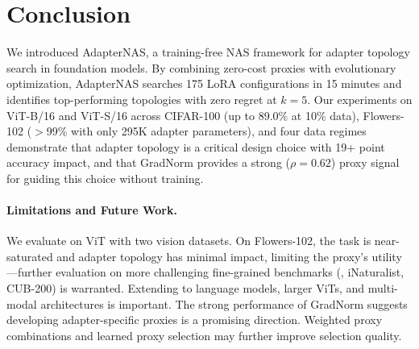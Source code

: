 \documentclass[10pt,twocolumn,letterpaper]{article}
\newcommand{\method}{AdapterNAS\xspace}
\begin{document}
\section{Conclusion}
\label{sec:conclusion}

We introduced \method, a training-free NAS framework for adapter topology search in foundation models. By combining zero-cost proxies with evolutionary optimization, \method searches 175 LoRA configurations in 15 minutes and identifies top-performing topologies with zero regret at $k{=}5$. Our experiments on ViT-B/16 and ViT-S/16 across CIFAR-100 (up to 89.0\% at 10\% data), Flowers-102 ($>$99\% with only 295K adapter parameters), and four data regimes demonstrate that adapter topology is a critical design choice with 19+ point accuracy impact, and that GradNorm provides a strong ($\rho = 0.62$) proxy signal for guiding this choice without training.

\paragraph{Limitations and Future Work.}
We evaluate on ViT with two vision datasets. On Flowers-102, the task is near-saturated and adapter topology has minimal impact, limiting the proxy's utility---further evaluation on more challenging fine-grained benchmarks (\eg, iNaturalist, CUB-200) is warranted. Extending to language models, larger ViTs, and multi-modal architectures is important. The strong performance of GradNorm suggests developing adapter-specific proxies is a promising direction. Weighted proxy combinations and learned proxy selection may further improve selection quality.

{
    \small
    
    
}
\end{document}
